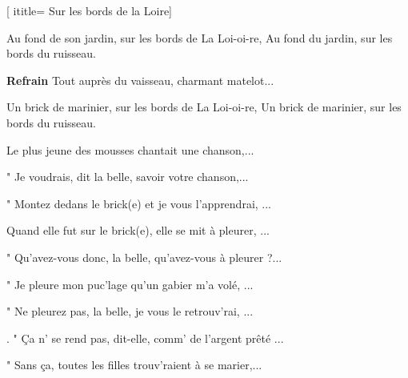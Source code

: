  [
ititle= {Sur les bords de la Loire}]


\beginverse
{}
Au fond de son jardin, sur les bords de La Loi-oi-re,
Au fond du jardin, sur les bords du ruisseau.
\endverse

\beginchorus
\textbf {Refrain}
Tout auprès du vaisseau, charmant matelot...
\endchorus

\beginverse
{}
Un brick de marinier, sur les bords de La Loi-oi-re,
Un brick de marinier, sur les bords du ruisseau.
\endverse

\beginverse
Le plus jeune des mousses chantait une chanson,...
\endverse

\beginverse
" Je voudrais, dit la belle, savoir votre chanson,...
\endverse

\beginverse
" Montez dedans le brick(e) et je vous l'apprendrai, ...
\endverse

\beginverse
Quand elle fut sur le brick(e), elle se mit à pleurer, ...
\endverse

\beginverse
" Qu'avez-vous donc, la belle, qu'avez-vous à pleurer ?...
\endverse

\beginverse
" Je pleure mon puc'lage qu'un gabier m'a volé, ...
\endverse

\beginverse
" Ne pleurez pas, la belle, je vous le retrouv'rai, ...
\endverse

\beginverse.
" Ça n' se rend pas, dit-elle, comm' de l'argent prêté ...
\endverse

\beginverse
" Sans ça, toutes les filles trouv'raient à se marier,...\endverse

\endsong